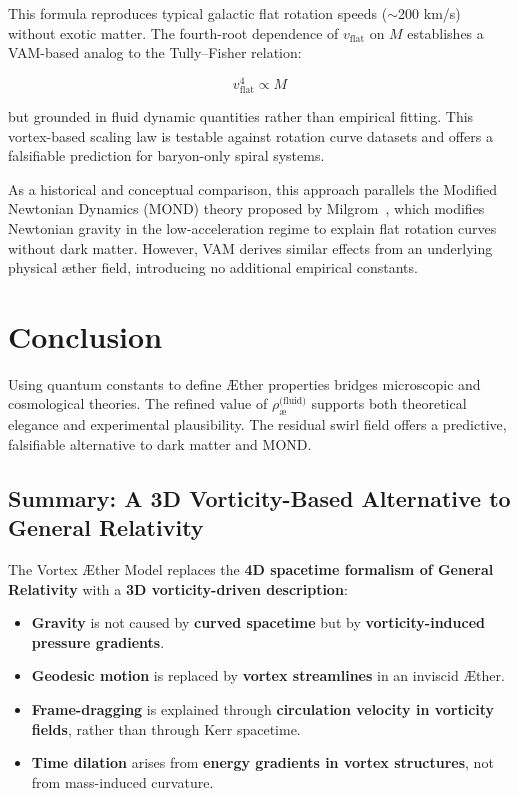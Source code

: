     This formula reproduces typical galactic flat rotation speeds ($\sim$200 km/s) without exotic matter. The fourth-root dependence of $v_{\text{flat}}$ on $M$ establishes a VAM-based analog to the Tully--Fisher relation:

    \[
        v_{\text{flat}}^4 \propto M
    \]

    but grounded in fluid dynamic quantities rather than empirical fitting. This vortex-based scaling law is testable against rotation curve datasets and offers a falsifiable prediction for baryon-only spiral systems.

    As a historical and conceptual comparison, this approach parallels the Modified Newtonian Dynamics (MOND) theory proposed by Milgrom~\cite{milgrom1983mond1, milgrom1983mond2}, which modifies Newtonian gravity in the low-acceleration regime to explain flat rotation curves without dark matter. However, VAM derives similar effects from an underlying physical æther field, introducing no additional empirical constants.

    \section{Conclusion}

    Using quantum constants to define \AE{}ther properties bridges microscopic and cosmological theories. The refined value of $\rho_{\text{\ae}}^{\text{(fluid)}}$ supports both theoretical elegance and experimental plausibility. The residual swirl field offers a predictive, falsifiable alternative to dark matter and MOND.




    \subsection*{Summary: A 3D Vorticity-Based Alternative to General Relativity}

The Vortex Æther Model replaces the \textbf{4D spacetime formalism of General Relativity} with a \textbf{3D vorticity-driven description}:

\begin{itemize}
    \item \textbf{Gravity} is not caused by \textbf{curved spacetime} but by \textbf{vorticity-induced pressure gradients}.
    \item \textbf{Geodesic motion} is replaced by \textbf{vortex streamlines} in an inviscid Æther.
    \item \textbf{Frame-dragging} is explained through \textbf{circulation velocity in vorticity fields}, rather than through Kerr spacetime.
    \item \textbf{Time dilation} arises from \textbf{energy gradients in vortex structures}, not from mass-induced curvature.
\end{itemize}


%
%
%
